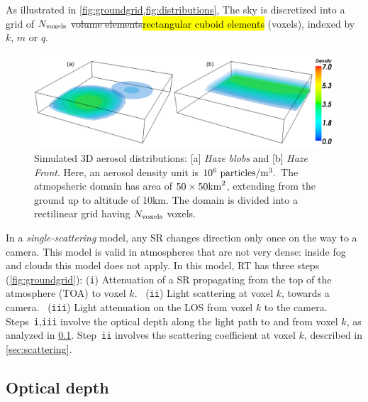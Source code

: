 \documentclass[10pt,letterpaper]{article}
\newcommand{\yoavcomment}[1]{}
\renewcommand{\yoavcomment}[1]{#1} %
\newcommand{\fix}[2]{\st{#1}\hl{#2}}
\begin{document}
As illustrated in \cref{fig:groundgrid,fig:distributions},
The sky is discretized into a grid of $N_{\rm voxels}$ \fix{volume
  elements}{rectangular cuboid elements}
(voxels), indexed by $k$, $m$ or $q$.
\begin{figure}
  \centering
  \yoavcomment{\includegraphics[width=\columnwidth]{images/distributions}}
  \caption{\small Simulated 3D aerosol distributions: [a] {\em Haze
      blobs} and [b] {\em Haze Front}.  Here, an aerosol density unit
    is $10^{6}~{\rm particles}/{\rm m}^3.$ The atmopsheric domain has
    area of $50\times 50{\rm km}^2$, extending from the ground up to
    altitude of 10km. The domain is divided into a rectilinear grid
    having $N_{\rm voxels}$ voxels.}
  \label{fig:distributions}
\end{figure}
In a \emph{single-scattering} model, any SR changes direction only
once on the way to a camera. This model is valid in atmospheres that
are not very dense: inside fog and clouds this model does not
apply. In this model, RT has three steps (\cref{fig:groundgrid}):
({\tt i}) Attenuation of a SR propagating from the top of the
atmosphere (TOA) to voxel $k$. ~({\tt ii}) Light scattering at voxel
$k$, towards a camera. ~({\tt iii}) Light attenuation on the LOS from
voxel $k$ to the camera.~~ Steps~{\tt i},{\tt iii} involve the optical
depth along the light path to and from voxel $k$, as analyzed in
\cref{sec:optical-depth}.  Step~{\tt ii} involves the scattering
coefficient at voxel $k$, described in \cref{sec:scattering}.


\subsection{Optical depth}
\label{sec:optical-depth}
\end{document}
